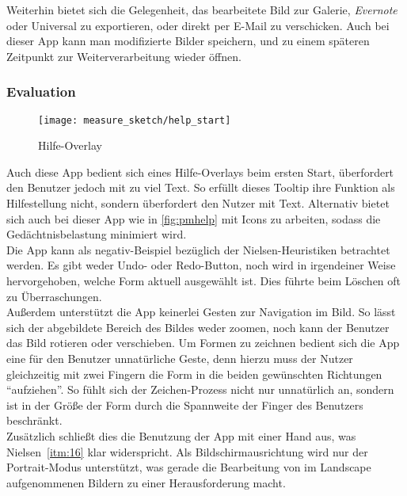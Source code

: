 Weiterhin bietet sich die Gelegenheit, das bearbeitete Bild zur Galerie, \emph{Evernote} oder Universal  zu exportieren, oder direkt per E-Mail zu verschicken.
Auch bei dieser App kann man modifizierte Bilder speichern, und zu einem späteren Zeitpunkt zur Weiterverarbeitung wieder öffnen. \\

\subsubsection{Evaluation}

\begin{wrapfigure}{R}{0.4\textwidth}
	\texttt{[image: measure\_sketch/help\_start]}
	\caption{Hilfe-Overlay}
	\label{fig:mshelp}
\end{wrapfigure}

Auch diese App bedient sich eines Hilfe-Overlays beim ersten Start, überfordert den Benutzer jedoch mit zu viel Text. So erfüllt dieses Tooltip ihre Funktion als Hilfestellung nicht, sondern überfordert den Nutzer mit Text. Alternativ bietet sich auch bei dieser App wie in \autoref{fig:pmhelp} mit Icons zu arbeiten, sodass die Gedächtnisbelastung minimiert wird. \\

Die App kann als negativ-Beispiel bezüglich der Nielsen-Heuristiken betrachtet werden. Es gibt weder Undo- oder Redo-Button, noch wird in irgendeiner Weise hervorgehoben, welche Form aktuell ausgewählt ist. Dies führte beim Löschen oft zu Überraschungen. \\

 Außerdem unterstützt die App keinerlei Gesten zur Navigation im Bild. So lässt sich der abgebildete Bereich des Bildes weder zoomen, noch kann der Benutzer das Bild rotieren oder verschieben. Um Formen zu zeichnen bedient sich die App eine für den Benutzer unnatürliche Geste, denn hierzu muss der Nutzer gleichzeitig mit zwei Fingern die Form in die beiden gewünschten Richtungen ``aufziehen''. So fühlt sich der Zeichen-Prozess nicht nur unnatürlich an, sondern ist in der Größe der Form durch die Spannweite der Finger des Benutzers beschränkt. \\
 
 Zusätzlich schließt dies die Benutzung der App mit einer Hand aus, was Nielsen~\autoref{itm:16} klar widerspricht. Als Bildschirmausrichtung wird nur der Portrait-Modus unterstützt, was gerade die Bearbeitung von im Landscape aufgenommenen Bildern zu einer Herausforderung macht. \\

